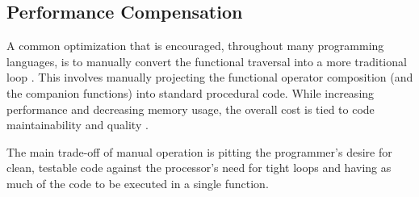 \subsection{Performance Compensation}
A common optimization that is encouraged, throughout many programming languages, is to manually convert the functional traversal into a more traditional  loop \cite{iterperf09} \cite{iterperf10} \cite{iterperf11}.  This involves manually projecting the functional operator composition (and the companion functions) into standard procedural code.  While increasing performance and decreasing memory usage, the overall cost is tied to code maintainability and quality \cite{langstudy14}.  

The main trade-off of manual operation is pitting the programmer's desire for clean, testable code against the processor's need for tight loops and having as much of the code to be executed in a single function.  